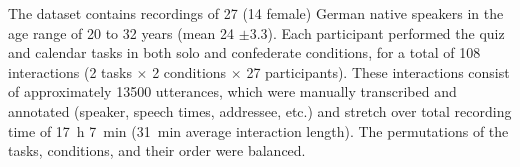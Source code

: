 The dataset contains recordings of 27 (14 female) German native speakers in the age range of 20 to 32 years (mean 24 $\pm$3.3).
Each participant performed the quiz and calendar tasks in both solo and confederate conditions, for a total of 108 interactions (2 tasks $\times$ 2 conditions $\times$ 27 participants).
These interactions consist of approximately \num{13500} utterances, which were manually transcribed and annotated (speaker, speech times, addressee, etc.) and stretch over total recording time of \SI{17}{\hour} \SI{7}{\minute} (\SI{31}{\minute} average interaction length).
The permutations of the tasks, conditions, and their order were balanced.




